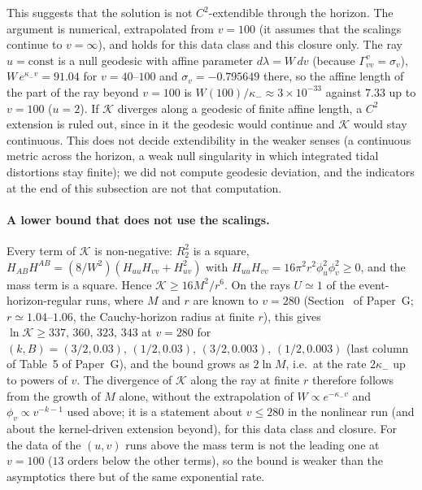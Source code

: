 \documentclass[11pt]{article}
\newcommand{\Gtabproj}{5}\newcommand{\Gtabehrate}{2}\newcommand{\Gtabeh}{1}\newcommand{\Gtabray}{4}
\begin{document}
This suggests that the solution is not $C^2$-extendible through the horizon. The argument is numerical, extrapolated from $v=100$ (it assumes that the scalings continue to $v=\infty$), and holds for this data class and this closure only. The ray $u=\text{const}$ is a null geodesic with affine parameter $d\lambda=W\,dv$ (because $\Gamma^v_{vv}=\sigma_v$), $W\,e^{\kappa_-v}=91.04$ for $v=40$--$100$ and $\sigma_v=-0.795649$ there, so the affine length of the part of the ray beyond $v=100$ is $W(100)/\kappa_-\approx3\times10^{-33}$ against $7.33$ up to $v=100$ ($u=2$). If $\mathcal K$ diverges along a geodesic of finite affine length, a $C^2$ extension is ruled out, since in it the geodesic would continue and $\mathcal K$ would stay continuous. This does not decide extendibility in the weaker senses (a continuous metric across the horizon, a weak null singularity in which integrated tidal distortions stay finite); we did not compute geodesic deviation, and the indicators at the end of this subsection are not that computation.

\paragraph{A lower bound that does not use the scalings.} Every term of $\mathcal K$ is non-negative: $R_2^2$ is a square, $H_{AB}H^{AB}=(8/W^2)(H_{uu}H_{vv}+H_{uv}^2)$ with $H_{uu}H_{vv}=16\pi^2r^2\phi_u^2\phi_v^2\ge0$, and the mass term is a square. Hence $\mathcal K\ge16M^2/r^6$. On the rays $U\simeq1$ of the event-horizon-regular runs, where $M$ and $r$ are known to $v=280$ (Section~\Grayn{} of Paper~G; $r\simeq1.04$--$1.06$, the Cauchy-horizon radius at finite $r$), this gives $\ln\mathcal K\ge337,\,360,\,323,\,343$ at $v=280$ for $(k,B)=(3/2,0.03),\,(1/2,0.03),\,(3/2,0.003),\,(1/2,0.003)$ (last column of Table~\Gtabproj{} of Paper~G), and the bound grows as $2\ln M$, i.e.\ at the rate $2\kappa_-$ up to powers of $v$. The divergence of $\mathcal K$ along the ray at finite $r$ therefore follows from the growth of $M$ alone, without the extrapolation of $W\propto e^{-\kappa_-v}$ and $\phi_v\propto v^{-k-1}$ used above; it is a statement about $v\le280$ in the nonlinear run (and about the kernel-driven extension beyond), for this data class and closure. For the data of the $(u,v)$ runs above the mass term is not the leading one at $v=100$ ($13$ orders below the other terms), so the bound is weaker than the asymptotics there but of the same exponential rate.
\end{document}
